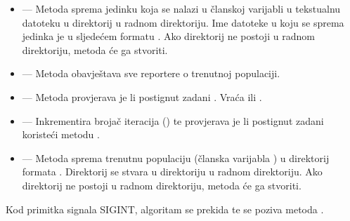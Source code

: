 \documentclass[times, utf8, zavrsni, numeric]{fer}
\begin{document}
\begin{itemize}
    \item {} --- Metoda sprema jedinku koja se
        nalazi u članskoj varijabli  u tekstualnu
        datoteku u direktorij  u radnom direktoriju.
        Ime datoteke u koju se sprema jedinka je u sljedećem formatu
        .  Ako direktorij
         ne postoji u radnom direktoriju, metoda će ga
        stvoriti.
    \item {} --- Metoda obavještava sve reportere o trenutnoj
        populaciji.
    \item {} --- Metoda provjerava je li postignut
        zadani . Vraća  ili .
    \item {} --- Inkrementira brojač iteracija
        () te provjerava je li postignut zadani
         koristeći metodu .
    \item {} --- Metoda sprema trenutnu populaciju
        (članska varijabla ) u direktorij formata
        .  Direktorij se
        stvara u direktoriju  u radnom direktoriju.
        Ako direktorij  ne postoji u radnom
        direktoriju, metoda će ga stvoriti.
\end{itemize}
Kod primitka signala SIGINT, algoritam se prekida te se poziva metoda
.
\end{document}
